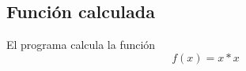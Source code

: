		\subsection{Función calculada}
		El programa calcula la función
		\begin{equation*}
  			f(x) = x*x
  		\end{equation*}
